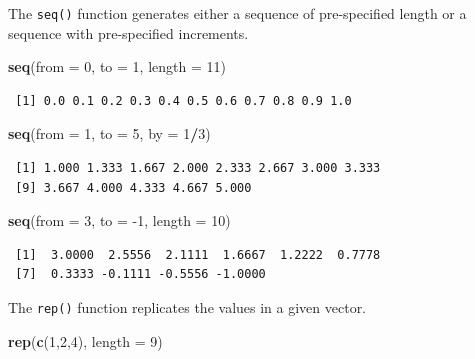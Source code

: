 \documentclass[
]{krantz}
\makeatletter
\newenvironment{Shaded}{\begin{snugshade}}{\end{snugshade}}
\newcommand{\DataTypeTok}[1]{\textcolor[rgb]{0.27,0.27,0.27}{#1}}
\newcommand{\DecValTok}[1]{\textcolor[rgb]{0.06,0.06,0.06}{#1}}
\newcommand{\KeywordTok}[1]{\textcolor[rgb]{0.27,0.27,0.27}{\textbf{#1}}}
\newcommand{\NormalTok}[1]{#1}
\newcommand{\OperatorTok}[1]{\textcolor[rgb]{0.43,0.43,0.43}{\textbf{#1}}}
\newenvironment{kframe}{%
\medskip{}
\setlength{\fboxsep}{.8em}
 \def\at@end@of@kframe{}%
 \ifinner\ifhmode%
  \def\at@end@of@kframe{\end{minipage}}%
  \begin{minipage}{\columnwidth}%
 \fi\fi%
 \def\FrameCommand##1{\hskip\@totalleftmargin \hskip-\fboxsep
 \colorbox{shadecolor}{##1}\hskip-\fboxsep
     \hskip-\linewidth \hskip-\@totalleftmargin \hskip\columnwidth}%
 \MakeFramed {\advance\hsize-\width
   \@totalleftmargin\z@ \linewidth\hsize
   \@setminipage}}%
 {\par\unskip\endMakeFramed%
 \at@end@of@kframe}
\renewenvironment{Shaded}{\begin{kframe}}{\end{kframe}}
\makeatother
\begin{document}
The \texttt{seq()} function generates either a sequence of pre-specified length or a sequence with pre-specified increments.

\begin{Shaded}
\begin{Highlighting}[]
\KeywordTok{seq}\NormalTok{(}\DataTypeTok{from =} \DecValTok{0}\NormalTok{, }\DataTypeTok{to =} \DecValTok{1}\NormalTok{, }\DataTypeTok{length =} \DecValTok{11}\NormalTok{)}
\end{Highlighting}
\end{Shaded}

\begin{verbatim}
 [1] 0.0 0.1 0.2 0.3 0.4 0.5 0.6 0.7 0.8 0.9 1.0
\end{verbatim}

\begin{Shaded}
\begin{Highlighting}[]
\KeywordTok{seq}\NormalTok{(}\DataTypeTok{from =} \DecValTok{1}\NormalTok{, }\DataTypeTok{to =} \DecValTok{5}\NormalTok{, }\DataTypeTok{by =} \DecValTok{1}\OperatorTok{/}\DecValTok{3}\NormalTok{)}
\end{Highlighting}
\end{Shaded}

\begin{verbatim}
 [1] 1.000 1.333 1.667 2.000 2.333 2.667 3.000 3.333
 [9] 3.667 4.000 4.333 4.667 5.000
\end{verbatim}

\begin{Shaded}
\begin{Highlighting}[]
\KeywordTok{seq}\NormalTok{(}\DataTypeTok{from =} \DecValTok{3}\NormalTok{, }\DataTypeTok{to =} \DecValTok{{-}1}\NormalTok{, }\DataTypeTok{length =} \DecValTok{10}\NormalTok{)}
\end{Highlighting}
\end{Shaded}

\begin{verbatim}
 [1]  3.0000  2.5556  2.1111  1.6667  1.2222  0.7778
 [7]  0.3333 -0.1111 -0.5556 -1.0000
\end{verbatim}

The \texttt{rep()} function replicates the values in a given vector.

\begin{Shaded}
\begin{Highlighting}[]
\KeywordTok{rep}\NormalTok{(}\KeywordTok{c}\NormalTok{(}\DecValTok{1}\NormalTok{,}\DecValTok{2}\NormalTok{,}\DecValTok{4}\NormalTok{), }\DataTypeTok{length =} \DecValTok{9}\NormalTok{)}
\end{Highlighting}
\end{Shaded}
\end{document}
